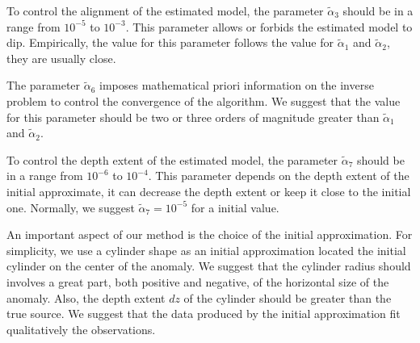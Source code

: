To control the alignment of the estimated model, the parameter $\tilde{\alpha}_3$ should be in a range from $10^{-5}$ to $10^{-3}$. This parameter allows or forbids the estimated model to dip. Empirically, the value for this parameter follows the value for $\tilde{\alpha}_1$ and $\tilde{\alpha}_2$, they are usually close.

The parameter $\tilde{\alpha}_6$ imposes mathematical priori information on the inverse problem to control the convergence of the algorithm. We suggest that the value for this parameter should be two or three orders of magnitude greater than $\tilde{\alpha}_1$ and $\tilde{\alpha}_2$.

To control the depth extent of the estimated model, the parameter $\tilde{\alpha}_7$ should be in a range from $10^{-6}$ to $10^{-4}$. This parameter depends on the depth extent of the initial approximate, it can decrease the depth extent or keep it close to the initial one. Normally, we suggest $\tilde{\alpha}_7=10^{-5}$ for a initial value.

An important aspect of our method is the choice of the initial approximation. For simplicity, we use a cylinder shape as an initial approximation located the initial cylinder on the center of the anomaly. We suggest that the cylinder radius should involves a great part, both positive and negative, of the horizontal size of the anomaly. Also, the depth extent $dz$ of the cylinder should be greater than the true source. We suggest that the data produced by the initial approximation fit qualitatively the observations.